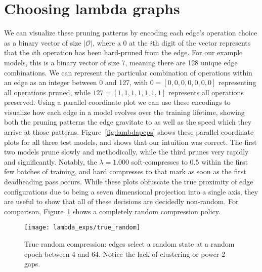 
\graphicspath{{Chapters/appendix_bonsai/figures/}}

\section{Choosing lambda graphs}
We can visualize these pruning patterns by encoding each edge's operation choice as a binary vector of size
$|\mathcal{O}|$, where a 0 at the $i$th digit of the vector represents that the $i$th operation has been hard-pruned from
the edge. For our example models, this is a binary vector of size 7, meaning there are 128 unique edge combinations.
We can represent the particular combination of operations within an edge as an integer between 0 and 127, with
$0=[0,0,0,0,0,0,0]$ representing all operations pruned, while $127=[1,1,1,1,1,1,1]$ represents all operations preserved.
Using a parallel coordinate plot we can use these encodings to visualize how each edge in a model evolves over the
training lifetime, showing both the pruning patterns the edge gravitate to as well as the speed which they arrive at those
patterns. Figure~\ref{fig:lambdapcps} shows these parallel coordinate plots for all three test models, and shows that our
intuition was correct. The first two models prune slowly and methodically, while the third prunes very rapidly and significantly.
Notably, the $\lambda=1.000$ soft-compresses to $0.5$ within the first few batches of training, and hard compresses to
that mark as soon as the first deadheading pass occurs. While these plots obfuscate the true proximity of edge configurations due to being a seven dimensional projection
into a single axis, they are useful to show that all of these decisions are decidedly non-random. For comparison,
Figure~\ref{fig:true_random} shows a completely random compression policy.

\begin{figure}[ht]
    \centering
	\texttt{[image: lambda\_exps/true\_random]}
	\caption{True random compression: edges select a random state at a random epoch between 4 and 64. Notice the
	lack of clustering or power-2 gaps.}
	\label{fig:true_random}
\end{figure}


